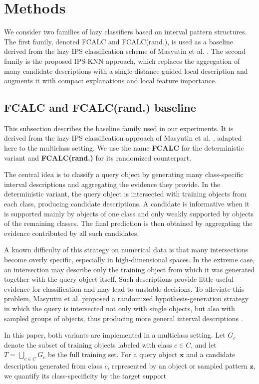 \documentclass[a4paper,fleqn]{cas-sc}
\begin{document}
\section{Methods}
We consider two families of lazy classifiers based on interval pattern structures. The first family, denoted FCALC and FCALC(rand.), is used as a baseline derived from the lazy IPS classification scheme of Masyutin et al. \cite{masyutin2015lazy}. The second family is the proposed IPS-KNN approach, which replaces the aggregation of many candidate descriptions with a single distance-guided local description and augments it with compact explanations and local feature importance.

\subsection{FCALC and FCALC(rand.) baseline}

This subsection describes the baseline family used in our experiments. It is derived from the lazy IPS classification approach of Masyutin et al. \cite{masyutin2015lazy}, adapted here to the multiclass setting. We use the name \textbf{FCALC} for the deterministic variant and \textbf{FCALC(rand.)} for its randomized counterpart.

The central idea is to classify a query object by generating many class-specific interval descriptions and aggregating the evidence they provide. In the deterministic variant, the query object is intersected with training objects from each class, producing candidate descriptions. A candidate is informative when it is supported mainly by objects of one class and only weakly supported by objects of the remaining classes. The final prediction is then obtained by aggregating the evidence contributed by all such candidates.

A known difficulty of this strategy on numerical data is that many intersections become overly specific, especially in high-dimensional spaces. In the extreme case, an intersection may describe only the training object from which it was generated together with the query object itself. Such descriptions provide little useful evidence for classification and may lead to unstable decisions. To alleviate this problem, Masyutin et al. proposed a randomized hypothesis-generation strategy in which the query is intersected not only with single objects, but also with sampled groups of objects, thus producing more general interval descriptions \cite{masyutin2015lazy}.

In this paper, both variants are implemented in a multiclass setting. Let \(G_c\) denote the subset of training objects labeled with class \(c \in C\), and let \(T=\bigcup_{c\in C} G_c\) be the full training set. For a query object \(\mathbf{x}\) and a candidate description generated from class \(c\), represented by an object or sampled pattern \(\mathbf{z}\), we quantify its class-specificity by the target support
\end{document}

